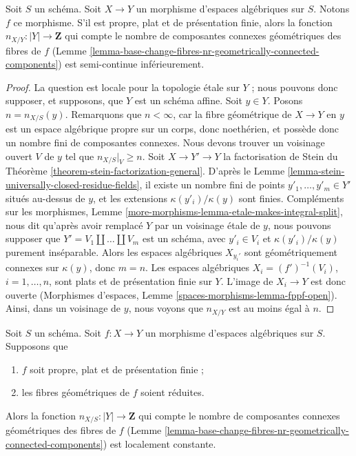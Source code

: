 \begin{lemma}
\label{lemma-proper-flat-nr-geom-conn-comps-lower-semicontinuous}
Soit $S$ un schéma.
Soit $X \to Y$ un morphisme d'espaces algébriques sur $S$.
Notons $f$ ce morphisme. S'il est propre, plat et de présentation finie, alors la fonction
$n_{X/Y} : |Y| \to \mathbf{Z}$ qui compte le nombre de composantes
connexes géométriques des fibres de $f$
(Lemme \ref{lemma-base-change-fibres-nr-geometrically-connected-components})
est semi-continue inférieurement.
\end{lemma}

\begin{proof}
La question est locale pour la topologie étale sur $Y$ ; nous pouvons donc supposer, et supposons,
que $Y$ est un schéma affine. Soit $y \in Y$. Posons $n = n_{X/S}(y)$.
Remarquons que $n < \infty$, car la fibre géométrique de $X \to Y$ en $y$
est un espace algébrique propre sur un corps, donc noethérien, et possède
donc un nombre fini de composantes connexes.
Nous devons trouver un voisinage ouvert $V$ de $y$ tel que $n_{X/S}|_V \geq n$.
Soit $X \to Y' \to Y$ la factorisation de Stein du
Théorème \ref{theorem-stein-factorization-general}.
D'après le Lemme \ref{lemma-stein-universally-closed-residue-fields},
il existe un nombre fini de points
$y'_1, \ldots, y'_m \in Y'$ situés au-dessus de $y$,
et les extensions $\kappa(y'_i)/\kappa(y)$ sont finies.
Compléments sur les morphismes, Lemme \ref{more-morphisms-lemma-etale-makes-integral-split},
nous dit qu'après avoir remplacé $Y$ par un voisinage étale
de $y$, nous pouvons supposer que $Y' = V_1 \amalg \ldots \amalg V_m$ est un schéma,
avec $y'_i \in V_i$ et $\kappa(y'_i)/\kappa(y)$ purement inséparable.
Alors les espaces algébriques $X_{y_i'}$ sont géométriquement connexes sur
$\kappa(y)$, donc $m = n$. Les espaces algébriques
$X_i = (f')^{-1}(V_i)$, $i = 1, \ldots, n$,
sont plats et de présentation finie sur $Y$. L'image de $X_i \to Y$
est donc ouverte (Morphismes d'espaces, Lemme \ref{spaces-morphisms-lemma-fppf-open}).
Ainsi, dans un voisinage de $y$, nous voyons que $n_{X/Y}$ est
au moins égal à $n$.
\end{proof}

\begin{lemma}
\label{lemma-proper-flat-geom-red}
Soit $S$ un schéma.
Soit $f : X \to Y$ un morphisme d'espaces algébriques sur $S$. Supposons que
\begin{enumerate}
\item $f$ soit propre, plat et de présentation finie ;
\item les fibres géométriques de $f$ soient réduites.
\end{enumerate}
Alors la fonction $n_{X/S} : |Y| \to \mathbf{Z}$
qui compte le nombre de composantes connexes géométriques
des fibres de $f$
(Lemme \ref{lemma-base-change-fibres-nr-geometrically-connected-components})
est localement constante.
\end{lemma}

